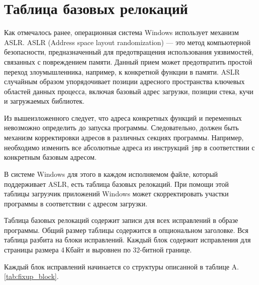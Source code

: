 
\section{Таблица базовых релокаций}

Как отмечалось ранее, операционная система Windows использует механизм ASLR.
ASLR (Address space layout randomization) --- это метод компьютерной
безопасности, предназначенный для предотвращения использования уязвимостей,
связанных с повреждением памяти. Данный прием может предотвратить простой
переход злоумышленника, например, к конкретной функции в памяти. ASLR случайным
образом упорядочивает позиции адресного пространства ключевых областей данных
процесса, включая базовый адрес загрузки, позиции стека, кучи и загружаемых
библиотек.

Из вышеизложенного следует, что адреса конкретных функций и переменных
невозможно определить до запуска программы. Следовательно, должен быть механизм
корректировки адресов в различных секциях программы. Например, необходимо
изменить все абсолютные адреса из инструкций \verb!jmp! в соответствии с
конкретным базовым адресом.

В системе Windows для этого в каждом исполняемом файле, который поддерживает
ASLR, есть таблица базовых релокаций. При помощи этой таблицы загрузчик
приложений Windows может скорректировать участки программы в соответствии с
адресом загрузки.

Таблица базовых релокаций содержит записи для всех исправлений в образе
программы. Общий размер таблицы содержится в опциональном заголовке. Вся таблица
разбита на блоки исправлений. Каждый блок содержит исправления для страницы
размера 4\,Кбайт и выровнен по 32-битной границе. 

Каждый блок исправлений начинается со структуры описанной в таблице 
A.\ref{tab:fixup_block}.


